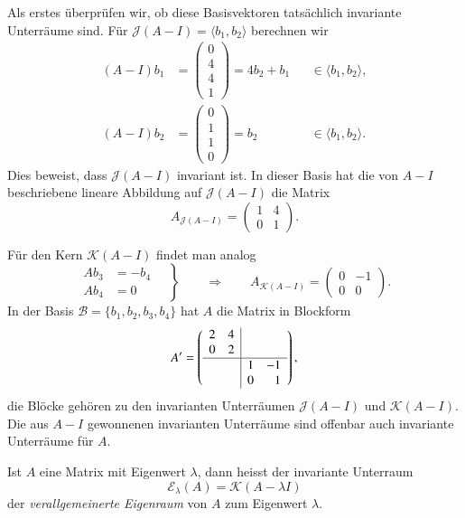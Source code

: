 \begin{beispiel}
Als erstes überprüfen wir, ob diese Basisvektoren tatsächlich invariante
Unterräume sind.
Für $\mathcal{J}(A-I) = \langle b_1,b_2\rangle$
berechnen wir
\[
\begin{aligned}
(A-I)b_1
&=
\begin{pmatrix} 0\\4\\4\\1 \end{pmatrix}
=
4b_2+b_1&&\in\langle b_1,b_2\rangle,
\\
(A-I)b_2
&=
\begin{pmatrix} 0\\1\\1\\0 \end{pmatrix}
=
b_2&&\in\langle b_1,b_2\rangle.
\end{aligned}
\]
Dies beweist, dass $\mathcal{J}(A-I)$ invariant ist.
In dieser Basis hat die von $A-I$ beschriebene lineare Abbildung
auf $\mathcal{J}(A-I)$ die Matrix
\[
A_{\mathcal{J}(A-I)}
=
\begin{pmatrix}
1&4\\
0&1
\end{pmatrix}.
\]

Für den Kern $\mathcal{K}(A-I)$ findet man analog
\[
\left.
\begin{aligned}
Ab_3
&=
-b_4
\\
Ab_4
&=0
\end{aligned}
\quad\right\}
\qquad\Rightarrow\qquad
A_{\mathcal{K}(A-I)}
=
\begin{pmatrix}
0&-1\\
0& 0
\end{pmatrix}.
\]
In der Basis $\mathcal{B}=\{b_1,b_2,b_3,b_4\}$ hat $A$ die Matrix
in Blockform
\[
A'
=
\left(
\begin{array}{cc|cr}
2&4& & \\
0&2& & \\
\hline
 & &1&-1\\
 & &0& 1
\end{array}\right),
\]
die Blöcke gehören zu den invarianten Unterräumen $\mathcal{J}(A-I)$
und $\mathcal{K}(A-I)$.
Die aus $A-I$ gewonnenen invarianten Unterräume sind offenbar auch invariante
Unterräume für $A$.
\end{beispiel}

\begin{definition}
Ist $A$ eine Matrix mit Eigenwert $\lambda$, dann heisst der invariante
Unterraum
\[
\mathcal{E}_{\lambda}(A)
=
\mathcal{K}(A-\lambda I)
\]
der {\em verallgemeinerte Eigenraum} von $A$ zum Eigenwert $\lambda$.
%
%
\end{definition}

